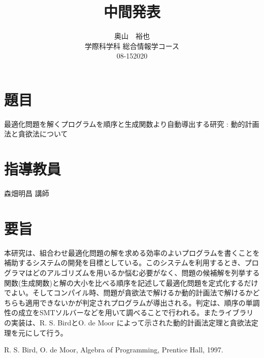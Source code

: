 \documentclass[11pt,a4paper]{jarticle}
\title{中間発表}
\author{奥山　裕也\\
        学際科学科 総合情報学コース\\
        08-152020\\
       }
\date{}
\begin{document}
\maketitle
\section*{題目}
最適化問題を解くプログラムを順序と生成関数より自動導出する研究 : 動的計画法と貪欲法について
\section*{指導教員}
森畑明昌 講師
\section*{要旨}
本研究は、組合わせ最適化問題の解を求める効率のよいプログラムを書くことを補助するシステムの開発を目標としている。このシステムを利用するとき、プログラマはどのアルゴリズムを用いるか悩む必要がなく、問題の候補解を列挙する関数(生成関数)と解の大小を比べる順序を記述して最適化問題を定式化するだけでよい。そしてコンパイル時、問題が貪欲法で解けるか動的計画法で解けるかどちらも適用できないかが判定されプログラムが導出される。判定は、順序の単調性の成立をSMTソルバーなどを用いて調べることで行われる。またライブラリの実装は、R. S. BirdとO. de Moor \cite{aop}によって示された動的計画法定理と貪欲法定理を元にして行う。
\begin{thebibliography}{9}
 R. S. Bird, O. de Moor, Algebra of Programming, Prentice Hall, 1997.
\end{thebibliography}
\end{document}
